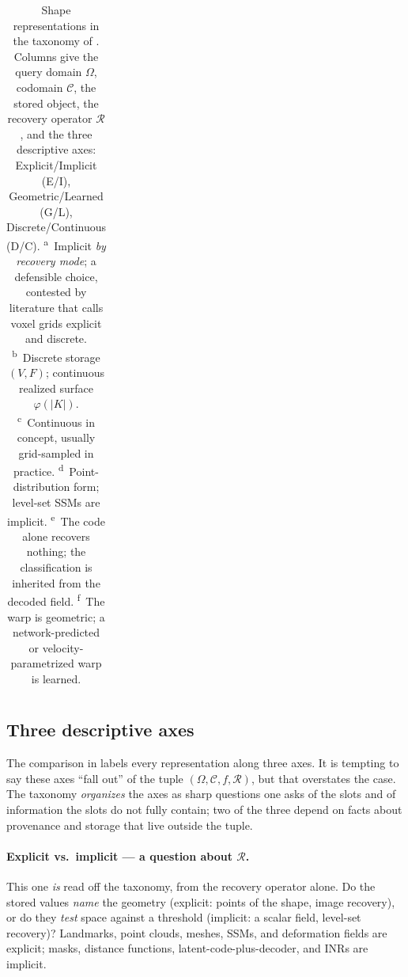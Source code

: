 \begin{table}[htbp]
\begin{tabularx}{\textwidth}{@{}l l l l X l l l@{}}
        \bottomrule
    \end{tabularx}
    \caption[Taxonomy of shape representations]{Shape representations in the taxonomy of
    . Columns give the query domain $\Omega$, codomain $\mathcal{C}$, the
    stored object, the recovery operator $\mathcal{R}$, and the three descriptive axes:
    Explicit/Implicit (E/I), Geometric/Learned (G/L), Discrete/Continuous (D/C).
    \textsuperscript{a}~Implicit \emph{by recovery mode}; a defensible choice, contested by
    literature that calls voxel grids explicit and discrete.
    \textsuperscript{b}~Discrete storage $(V,F)$; continuous realized surface $\varphi(|K|)$.
    \textsuperscript{c}~Continuous in concept, usually grid-sampled in practice.
    \textsuperscript{d}~Point-distribution form; level-set SSMs are implicit.
    \textsuperscript{e}~The code alone recovers nothing; the classification is inherited from the
    decoded field. \textsuperscript{f}~The warp is geometric; a network-predicted or
    velocity-parametrized warp is learned.}
    \label{tab:shape-representations}
\end{table}

\subsection{Three descriptive axes}
\label{sec:shape-axes}

The comparison in  labels every representation along three axes.
It is tempting to say these axes ``fall out'' of the tuple $(\Omega, \mathcal{C}, f, \mathcal{R})$,
but that overstates the case. The taxonomy \emph{organizes} the axes as sharp questions one asks of the
slots and of information the slots do not fully contain; two of the three depend on facts about
provenance and storage that live outside the tuple.

\paragraph{Explicit vs.\ implicit --- a question about $\mathcal{R}$.} This one \emph{is} read off
the taxonomy, from the recovery operator alone. Do the stored values \emph{name} the geometry
(explicit: points of the shape, image recovery), or do they \emph{test} space against a threshold
(implicit: a scalar field, level-set recovery)? Landmarks, point clouds, meshes, SSMs, and
deformation fields are explicit; masks, distance functions, latent-code-plus-decoder, and INRs are
implicit.


